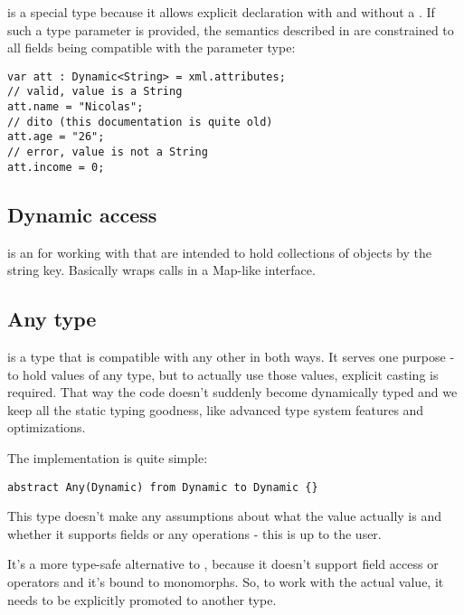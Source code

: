  is a special type because it allows explicit declaration with and without a . If such a type parameter is provided, the semantics described in  are constrained to all fields being compatible with the parameter type:

\begin{lstlisting}
var att : Dynamic<String> = xml.attributes;
// valid, value is a String
att.name = "Nicolas";
// dito (this documentation is quite old)
att.age = "26";
// error, value is not a String
att.income = 0;
\end{lstlisting}


\subsection{Dynamic access}
\label{types-dynamic-access}

 is an  for working with  that are intended to hold collections of objects by the string key. Basically  wraps  calls in a Map-like interface.


\subsection{Any type}
\label{types-dynamic-any}

 is a type that is compatible with any other in both ways. 
It serves one purpose - to hold values of any type, but to actually use those values, explicit casting is required. That way the code doesn't suddenly become dynamically typed and we keep all the static typing goodness, like advanced type system features and optimizations.

The implementation is quite simple:

\begin{lstlisting}
abstract Any(Dynamic) from Dynamic to Dynamic {}
\end{lstlisting}

This type doesn't make any assumptions about what the value actually is and whether it supports fields or any operations - this is up to the user.


It's a more type-safe alternative to , because it doesn't support field access or operators and it's bound to monomorphs. So, to work with the actual value, it needs to be explicitly promoted to another type.



